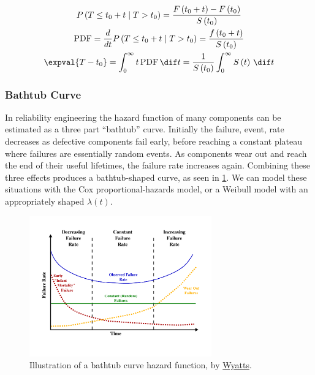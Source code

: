 \begin{subequations}\label{eq:Survival:efl_der}
\begin{gather}
P\left(T \leq t_{0} + t \mid T > t_{0}\right)
= \frac{F\left(t_{0} + t\right) - F\left(t_{0}\right)}{S\left(t_{0}\right)} \label{eq:Survival:efl_der:P} \\
\text{PDF}
= \frac{d}{dt} P\left(T \leq t_{0} + t \mid T > t_{0}\right)
= \frac{f\left(t_{0} + t\right)}{S\left(t_{0}\right)} \label{eq:Survival:efl_der:pdf} \\
\expval{T-t_{0}}
= \int_{0}^{\infty} t \, \text{PDF} \, \dif t
= \frac{1}{S\left(t_{0}\right)} \int_{0}^{\infty} S\left(t\right) \, \dif t \label{eq:Survival:efl_der:efl}
\end{gather}
\end{subequations}

\subsubsection{Bathtub Curve}
\label{additional:Survival:additional:bathtub}

In reliability engineering the hazard function of many components
can be estimated as a three part ``bathtub'' curve.
Initially the failure, \ie event, rate decreases as defective components fail early,
before reaching a constant plateau where failures are essentially random events.
As components wear out and reach the end of their useful lifetimes, the failure rate increases again.
Combining these three effects produces a bathtub-shaped curve, as seen in \cref{fig:bathtub_curve}.
We can model these situations with the Cox proportional-hazards model,
or a Weibull model with an appropriately shaped $\lambda\left(t\right)$.

\begin{figure}[H]
\centering
\includegraphics[width=0.7\textwidth]{figures/survival/bathtub_curve}
\vspace{0.2cm}
\caption{
Illustration of a bathtub curve hazard function, by \href{https://en.wikipedia.org/wiki/File:Bathtub_curve.svg}{Wyatts}.
}
\label{fig:bathtub_curve}
\end{figure}

